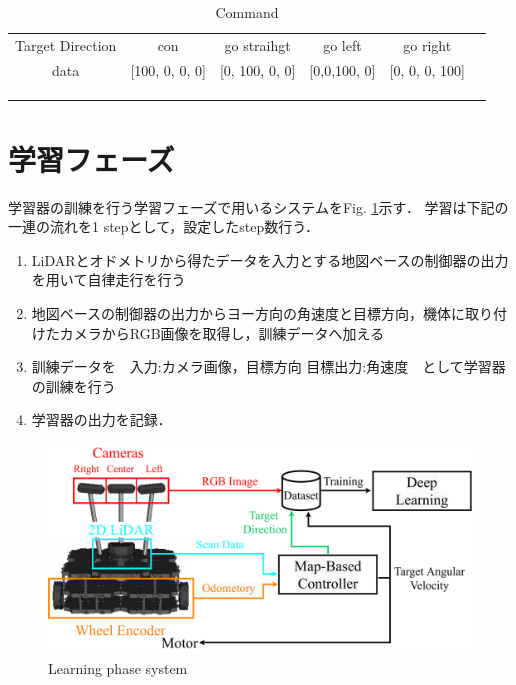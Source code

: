    \begin{table}[h]
      \centering
      \caption{Command}
      \begin{tabular}{ccccll}
      \cline{1-5}
      \multicolumn{1}{|c|}{Target Direction} & \multicolumn{1}{c|}{con}&\multicolumn{1}{c|}{go straihgt}          & \multicolumn{1}{c|}{go left}          & \multicolumn{1}{c|}{go right}          &  \\ \cline{1-5}
      \multicolumn{1}{|c|}{data}  &\multicolumn{1}{c|}{{[}100, 0, 0, 0{]}}& \multicolumn{1}{c|}{{[}0, 100, 0, 0{]}} & \multicolumn{1}{c|}{{[}0,0,100, 0{]}} & \multicolumn{1}{l|}{{[}0, 0, 0, 100{]}} &  \\ \cline{1-5}
                                 &                                  &                                  &                                  &  \\
                                 &                                  &                                  &                                  &  \\
      \multicolumn{1}{l}{}       &                                  &                                  &                                  & 
      \end{tabular}
      \vspace{-3.0zh}
      \label{tb:command_4}
      \end{table}

\newpage
\section{学習フェーズ}
\label{lerning}
学習器の訓練を行う学習フェーズで用いるシステムをFig. \ref{fig::learningsystem}示す．
学習は下記の一連の流れを1 stepとして，設定したstep数行う．
\begin{enumerate}
    \item LiDARとオドメトリから得たデータを入力とする地図ベースの制御器の出力を用いて自律走行を行う
    \item 地図ベースの制御器の出力からヨー方向の角速度と目標方向，機体に取り付けたカメラからRGB画像を取得し，訓練データへ加える
    \item 訓練データを　入力:カメラ画像，目標方向 目標出力:角速度　として学習器の訓練を行う
    \item 学習器の出力を記録．
  \end{enumerate}

  \begin{figure}[h]
    \centering
    \includegraphics[width = 12cm]{./figs/system_learning.pdf}
    \caption{Learning phase system }
    \label{fig::learningsystem}
\end{figure}

